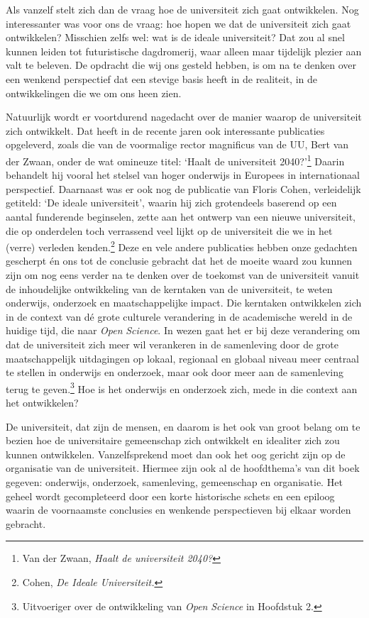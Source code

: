 \documentclass[smallauthor, chapterhaspagenum, nochapterinheader, pagenuminheader,  bigchapnum,medium2, tocpages, garamond, titleinheader]{jote-book}
\begin{document}
	Als vanzelf stelt zich dan de vraag hoe de universiteit zich gaat ontwikkelen. Nog interessanter was voor ons de vraag: hoe hopen we dat de universiteit zich gaat ontwikkelen? Misschien zelfs wel: wat is de ideale universiteit? Dat zou al snel kunnen leiden tot futuristische dagdromerij, waar alleen maar tijdelijk plezier aan valt te beleven. De opdracht die wij ons gesteld hebben, is om na te denken over een wenkend perspectief dat een stevige basis heeft in de realiteit, in de ontwikkelingen die we om ons heen zien.







	Natuurlijk wordt er voortdurend nagedacht over de manier waarop de universiteit zich ontwikkelt. Dat heeft in de recente jaren ook interessante publicaties opgeleverd, zoals die van de voormalige rector magnificus van de UU, Bert van der Zwaan, onder de wat omineuze titel: ‘Haalt de universiteit 2040?'\footnote{Van der Zwaan, \emph{Haalt de universiteit 2040?}} Daarin behandelt hij vooral het stelsel van hoger onderwijs in Europees in internationaal perspectief. Daarnaast was er ook nog de publicatie van Floris Cohen, verleidelijk getiteld: ‘De ideale universiteit', waarin hij zich grotendeels baserend op een aantal funderende beginselen, zette aan het ontwerp van een nieuwe universiteit, die op onderdelen toch verrassend veel lijkt op de universiteit die we in het (verre) verleden kenden.\footnote{Cohen, \emph{De Ideale Universiteit}\emph{.}} Deze en vele andere publicaties hebben onze gedachten gescherpt én ons tot de conclusie gebracht dat het de moeite waard zou kunnen zijn om nog eens verder na te denken over de toekomst van de universiteit vanuit de inhoudelijke ontwikkeling van de kerntaken van de universiteit, te weten onderwijs, onderzoek en maatschappelijke impact. Die kerntaken ontwikkelen zich in de context van dé grote culturele verandering in de academische wereld in de huidige tijd, die naar \emph{Open }\emph{Science}. In wezen gaat het er bij deze verandering om dat de universiteit zich meer wil verankeren in de samenleving door de grote maatschappelijk uitdagingen op lokaal, regionaal en globaal niveau meer centraal te stellen in onderwijs en onderzoek, maar ook door meer aan de samenleving terug te geven.\footnote{Uitvoeriger over de ontwikkeling van \emph{Open }\emph{Science} in Hoofdstuk 2.} Hoe is het onderwijs en onderzoek zich, mede in die context aan het ontwikkelen?



	De universiteit, dat zijn de mensen, en daarom is het ook van groot belang om te bezien hoe de universitaire gemeenschap zich ontwikkelt en idealiter zich zou kunnen ontwikkelen. Vanzelfsprekend moet dan ook het oog gericht zijn op de organisatie van de universiteit. Hiermee zijn ook al de hoofdthema's van dit boek gegeven: onderwijs, onderzoek, samenleving, gemeenschap en organisatie. Het geheel wordt gecompleteerd door een korte historische schets en een epiloog waarin de voornaamste conclusies en wenkende perspectieven bij elkaar worden gebracht.
\end{document}

